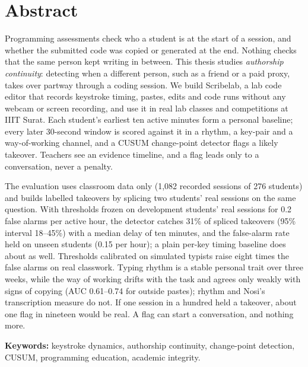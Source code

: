 \chapter*{Abstract}

Programming assessments check who a student is at the start of a session,
and whether the submitted code was copied or generated at the end. Nothing
checks that the same person kept writing in between. This thesis studies
\emph{authorship continuity}: detecting when a different person, such as a
friend or a paid proxy, takes over partway through a coding session. We
build Scribelab, a lab code editor that records keystroke timing, pastes,
edits and code runs without any webcam or screen recording, and use it in
real lab classes and competitions at IIIT Surat. Each student's earliest ten
active minutes form a personal baseline; every later 30-second window is
scored against it in a rhythm, a key-pair and a way-of-working channel, and a
CUSUM change-point detector flags a likely takeover. Teachers see an evidence
timeline, and a flag leads only to a conversation, never a penalty.

The evaluation uses classroom data only (1,082 recorded sessions of 276 students) and
builds labelled takeovers by splicing two students' real sessions on the same
question. With thresholds frozen on development students' real sessions for
0.2 false alarms per active hour, the detector catches 31\% of spliced
takeovers (95\% interval 18--45\%) with a median delay of ten minutes, and the
false-alarm rate held on unseen students (0.15 per hour); a plain per-key
timing baseline does about as well. Thresholds calibrated on simulated typists
raise eight times the false alarms on real classwork. Typing rhythm is a stable
personal trait over three weeks, while the way of working drifts with the task
and agrees only weakly with signs of copying (AUC 0.61--0.74 for outside
pastes); rhythm and Nosi's transcription measure do not. If one session in a
hundred held a takeover, about one flag in nineteen would be real. A flag can
start a conversation, and nothing more.

\vspace{1em}
\noindent\textbf{Keywords:} keystroke dynamics, authorship continuity,
change-point detection, CUSUM, programming education, academic integrity.
